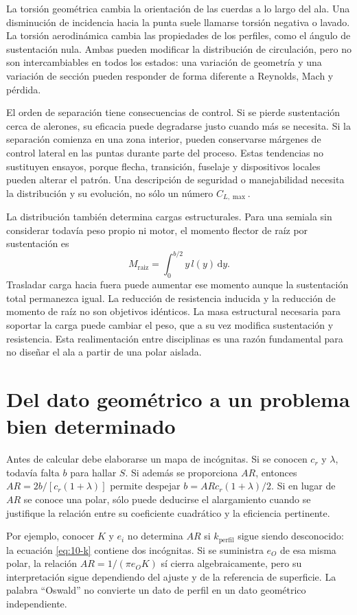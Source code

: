 La torsión geométrica cambia la orientación de las cuerdas a lo largo del ala. Una disminución de incidencia hacia la punta suele llamarse torsión negativa o lavado. La torsión aerodinámica cambia las propiedades de los perfiles, como el ángulo de sustentación nula. Ambas pueden modificar la distribución de circulación, pero no son intercambiables en todos los estados: una variación de geometría y una variación de sección pueden responder de forma diferente a Reynolds, Mach y pérdida.

El orden de separación tiene consecuencias de control. Si se pierde sustentación cerca de alerones, su eficacia puede degradarse justo cuando más se necesita. Si la separación comienza en una zona interior, pueden conservarse márgenes de control lateral en las puntas durante parte del proceso. Estas tendencias no sustituyen ensayos, porque flecha, transición, fuselaje y dispositivos locales pueden alterar el patrón. Una descripción de seguridad o manejabilidad necesita la distribución y su evolución, no sólo un número $C_{L,\max}$.

La distribución también determina cargas estructurales. Para una semiala sin considerar todavía peso propio ni motor, el momento flector de raíz por sustentación es
\begin{equation}
M_{\mathrm{raiz}}=\int_0^{b/2}y\,l(y)\,\mathrm dy.
\end{equation}
Trasladar carga hacia fuera puede aumentar ese momento aunque la sustentación total permanezca igual. La reducción de resistencia inducida y la reducción de momento de raíz no son objetivos idénticos. La masa estructural necesaria para soportar la carga puede cambiar el peso, que a su vez modifica sustentación y resistencia. Esta realimentación entre disciplinas es una razón fundamental para no diseñar el ala a partir de una polar aislada.

\section{Del dato geométrico a un problema bien determinado}
Antes de calcular debe elaborarse un mapa de incógnitas. Si se conocen $c_r$ y $\lambda$, todavía falta $b$ para hallar $S$. Si además se proporciona $AR$, entonces $AR=2b/[c_r(1+\lambda)]$ permite despejar $b=ARc_r(1+\lambda)/2$. Si en lugar de $AR$ se conoce una polar, sólo puede deducirse el alargamiento cuando se justifique la relación entre su coeficiente cuadrático y la eficiencia pertinente.

Por ejemplo, conocer $K$ y $e_i$ no determina $AR$ si $k_{\mathrm{perfil}}$ sigue siendo desconocido: la ecuación \eqref{eq:10-k} contiene dos incógnitas. Si se suministra $e_O$ de esa misma polar, la relación $AR=1/(\pi e_OK)$ sí cierra algebraicamente, pero su interpretación sigue dependiendo del ajuste y de la referencia de superficie. La palabra ``Oswald'' no convierte un dato de perfil en un dato geométrico independiente.

